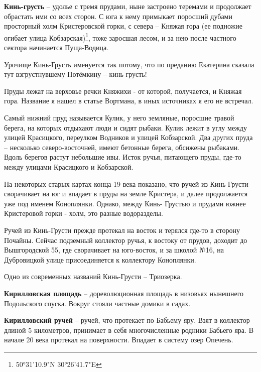 \textbf{Кинь-грусть} – удолье с тремя прудами, ныне застроено теремами и продолжает обрастать ими со всех сторон. С юга к нему примыкает поросший дубами просторный холм Кристеровской горки, с севера – Княжая гора (ее подножие огибает улица Кобзарская)\footnote{50°31'10.9"N 30°26'41.7"E}, тоже заросшая лесом, и за нею после частного сектора начинается Пуща-Водица. 

Урочище Кинь-Грусть именуется так потому, что по преданию Екатерина сказала тут взгрустнувшему Потёмкину – кинь грусть!

Пруды лежат на верховье речки Княжихи - от которой, получается, и Княжая гора. Название я нашел в статье Вортмана, в иных источниках я его не встречал. 

Самый нижний пруд называется Кулик, у него земляные, поросшие травой берега, на которых отдыхают люди и сидят рыбаки. Кулик лежит в углу между улицей Красицкого, переулком Водников и улицей Кобзарской. Два других пруда – несколько северо-восточней, имеют бетонные берега, обсижены рыбаками. Вдоль берегов растут небольшие ивы. Исток ручья, питающего пруды, где-то между улицами Красицкого и Кобзарской.

На некоторых старых картах конца 19 века показано, что ручей из Кинь-Грусти сворачивает на юг и впадает в пруды на земле Кристера, и далее продолжается уже под именем Коноплянки. Однако, между Кинь- Грустью и прудами южнее Кристеровой горки - холм, это разные водоразделы.

Ручей из Кинь-Грусти прежде протекал на восток и терялся где-то в сторону Почайны. Сейчас подземный коллектор ручья, к востоку от прудов, доходит до Вышгородской 55, где сворачивает на юго-восток, и за школой №16, на Дубровицкой улице присоединяется к коллектору Коноплянки.

Одно из современных названий Кинь-Грусти – Триозерка.\\


\medskip


\textbf{Кирилловская площадь} – дореволюционная площадь в низовьях нынешнего Подольского спуска. Вокруг стояли частные домики в садах.\\


\medskip


\textbf{Кирилловский ручей} – ручей, что протекает по Бабьему яру. Взят в коллектор длиной 5 километров, принимает в себя многочисленные родники Бабьего яра. В начале 20 века протекал на поверхности. Впадает в систему озер Опечень.\\

